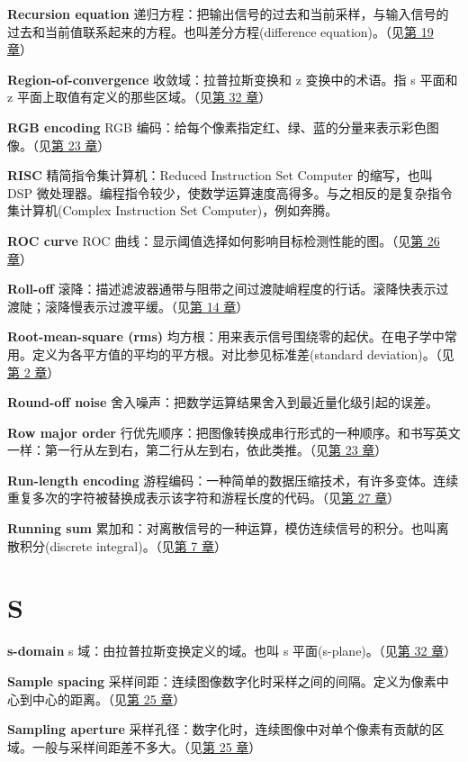 \textbf{Recursion equation}
递归方程：把输出信号的过去和当前采样，与输入信号的过去和当前值联系起来的方程。也叫差分方程(difference
equation)。（见\hyperref[ch-19]{第 19 章}）

\textbf{Region-of-convergence} 收敛域：拉普拉斯变换和 z 变换中的术语。指
s 平面和 z 平面上取值有定义的那些区域。（见\hyperref[ch-32]{第 32 章}）

\textbf{RGB encoding} RGB
编码：给每个像素指定红、绿、蓝的分量来表示彩色图像。（见\hyperref[ch-23]{第
23 章}）

\textbf{RISC} 精简指令集计算机：Reduced Instruction Set Computer
的缩写，也叫 DSP
微处理器。编程指令较少，使数学运算速度高得多。与之相反的是复杂指令集计算机(Complex
Instruction Set Computer)，例如奔腾。

\textbf{ROC curve} ROC
曲线：显示阈值选择如何影响目标检测性能的图。（见\hyperref[ch-26]{第 26
章}）

\textbf{Roll-off}
滚降：描述滤波器通带与阻带之间过渡陡峭程度的行话。滚降快表示过渡陡；滚降慢表示过渡平缓。（见\hyperref[ch-14]{第
14 章}）

\textbf{Root-mean-square (rms)}
均方根：用来表示信号围绕零的起伏。在电子学中常用。定义为各平方值的平均的平方根。对比参见标准差(standard
deviation)。（见\hyperref[ch-02]{第 2 章}）

\textbf{Round-off noise}
舍入噪声：把数学运算结果舍入到最近量化级引起的误差。

\textbf{Row major order}
行优先顺序：把图像转换成串行形式的一种顺序。和书写英文一样：第一行从左到右，第二行从左到右，依此类推。（见\hyperref[ch-23]{第
23 章}）

\textbf{Run-length encoding}
游程编码：一种简单的数据压缩技术，有许多变体。连续重复多次的字符被替换成表示该字符和游程长度的代码。（见\hyperref[ch-27]{第
27 章}）

\textbf{Running sum}
累加和：对离散信号的一种运算，模仿连续信号的积分。也叫离散积分(discrete
integral)。（见\hyperref[ch-07]{第 7 章}）

\section{S}

\textbf{s-domain} s 域：由拉普拉斯变换定义的域。也叫 s
平面(s-plane)。（见\hyperref[ch-32]{第 32 章}）

\textbf{Sample spacing}
采样间距：连续图像数字化时采样之间的间隔。定义为像素中心到中心的距离。（见\hyperref[ch-25]{第
25 章}）

\textbf{Sampling aperture}
采样孔径：数字化时，连续图像中对单个像素有贡献的区域。一般与采样间距差不多大。（见\hyperref[ch-25]{第
25 章}）

